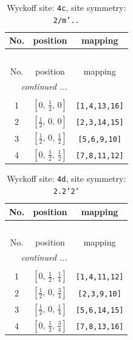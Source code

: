 \documentclass[fleqn,8pt]{jsarticle}
\begin{document}
\renewcommand{\arraystretch}{1.2}
\begin{longtable}{ccc}
\caption{Wyckoff site: {\tt 4c}, site symmetry: {\tt 2/m'..}}
 \\
 \hline \hline
No. & position & mapping \\ \hline \endfirsthead

\multicolumn{2}{l}{\tablename\ \thetable{}} \\
 \hline \hline
No. & position & mapping \\ \hline \endhead

 \hline \hline
\multicolumn{2}{r}{\footnotesize\it continued ...} \\ \endfoot

 \hline \hline
\multicolumn{2}{r}{} \\ \endlastfoot

1 & $\left[ 0,\, \frac{1}{2},\, 0 \right]$ & {\tt [1,4,13,16]} \\ \hline
2 & $\left[ \frac{1}{2},\, 0,\, 0 \right]$ & {\tt [2,3,14,15]} \\ \hline
3 & $\left[ \frac{1}{2},\, 0,\, \frac{1}{2} \right]$ & {\tt [5,6,9,10]} \\ \hline
4 & $\left[ 0,\, \frac{1}{2},\, \frac{1}{2} \right]$ & {\tt [7,8,11,12]} \\
\end{longtable}
\renewcommand{\arraystretch}{1.2}
\begin{longtable}{ccc}
\caption{Wyckoff site: {\tt 4d}, site symmetry: {\tt 2.2'2'}}
 \\
 \hline \hline
No. & position & mapping \\ \hline \endfirsthead

\multicolumn{2}{l}{\tablename\ \thetable{}} \\
 \hline \hline
No. & position & mapping \\ \hline \endhead

 \hline \hline
\multicolumn{2}{r}{\footnotesize\it continued ...} \\ \endfoot

 \hline \hline
\multicolumn{2}{r}{} \\ \endlastfoot

1 & $\left[ 0,\, \frac{1}{2},\, \frac{1}{4} \right]$ & {\tt [1,4,11,12]} \\ \hline
2 & $\left[ \frac{1}{2},\, 0,\, \frac{3}{4} \right]$ & {\tt [2,3,9,10]} \\ \hline
3 & $\left[ \frac{1}{2},\, 0,\, \frac{1}{4} \right]$ & {\tt [5,6,14,15]} \\ \hline
4 & $\left[ 0,\, \frac{1}{2},\, \frac{3}{4} \right]$ & {\tt [7,8,13,16]} \\
\end{longtable}
\end{document}
